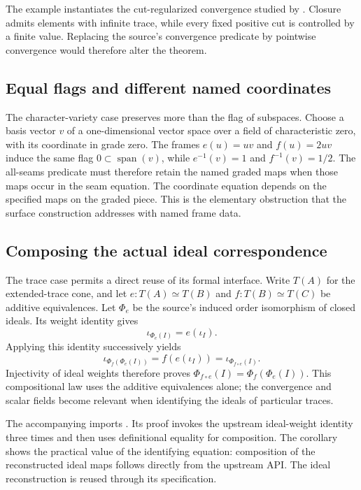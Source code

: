 The example instantiates the cut-regularized convergence studied by \citet{ElliottRobertSantiago2011}. Closure admits elements with infinite
trace, while every fixed positive cut is controlled by a finite value.
Replacing the source's convergence predicate by pointwise convergence
would therefore alter the theorem.


\subsection{Equal flags and different named coordinates}
\label{sec:named-maps}

The character-variety case preserves more than the flag of subspaces.
Choose a basis vector $v$ of a one-dimensional vector space over a field of characteristic zero, with its coordinate in grade zero. The frames $e(u)=uv$ and $f(u)=2uv$ induce the same flag
$0\subset\operatorname{span}(v)$, while
$e^{-1}(v)=1$ and $f^{-1}(v)=1/2$. The all-seams predicate must therefore
retain the named graded maps when those maps occur in the seam equation.
The coordinate equation depends on the specified maps on the graded piece. This is the elementary obstruction that the surface construction addresses with named frame data.

\subsection{Composing the actual ideal correspondence}
\label{sec:upstream-reuse}

The trace case permits a direct reuse of its formal interface. Write $T(A)$ for the extended-trace cone, and let $e:T(A)\simeq T(B)$ and $f:T(B)\simeq T(C)$ be additive equivalences. Let $\Phi_e$ be the source's induced order
isomorphism of closed ideals. Its weight identity gives
\[
 \iota_{\Phi_e(I)}=e(\iota_I).
\]
Applying this identity successively yields
\[
 \iota_{\Phi_f(\Phi_e(I))}
 =f(e(\iota_I))
 =\iota_{\Phi_{f\circ e}(I)}.
\]
Injectivity of ideal weights therefore proves
$\Phi_{f\circ e}(I)=\Phi_f(\Phi_e(I))$.
This compositional law uses the additive equivalences alone; the
convergence and scalar fields become relevant when identifying the ideals
of particular traces.

The accompanying  imports
. Its proof invokes the
upstream ideal-weight identity three times and then uses definitional
equality for composition. The corollary shows the practical value of the identifying equation: composition of the reconstructed ideal maps follows directly from the upstream API. The ideal reconstruction is reused through its specification.

